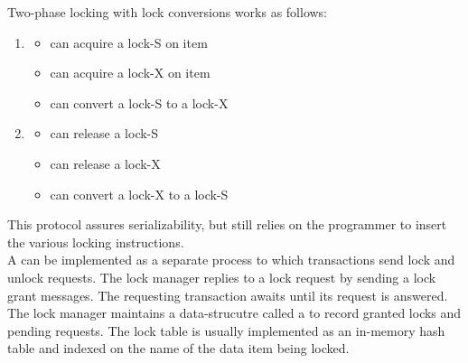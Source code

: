 \documentclass{article}
\begin{document}
Two-phase locking with lock conversions works as follows: 
\begin{enumerate}
  \item {} 
  \begin{itemize}
    \item can acquire a lock-S on item 
    \item can acquire a lock-X on item 
    \item can convert a lock-S to a lock-X
  \end{itemize}
  \item {}
  \begin{itemize}
    \item can release a lock-S 
    \item can release a lock-X 
    \item can convert a lock-X to a lock-S
  \end{itemize}
\end{enumerate}
This protocol assures serializability, but still relies on the programmer to insert the various locking instructions. \\ 

A  can be implemented as a separate process to which transactions send lock and unlock requests. The lock manager replies to a lock request by sending a lock grant messages. The requesting transaction awaits until its request is answered. The lock manager maintains a data-strucutre called a  to record granted locks and pending requests. The lock table is usually implemented as an in-memory hash table and indexed on the name of the data item being locked. \\ 
\end{document}
